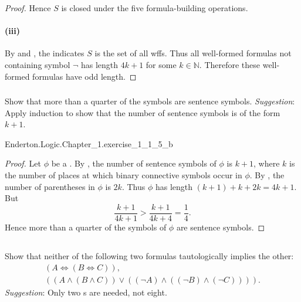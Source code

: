 \documentclass{report}
\begin{document}
\begin{proof}
      Hence $S$ is closed under the five formula-building operations.

    \paragraph{(iii)}%

      By  and ,
        the  indicates $S$ is the set of all
        wffs.
      Thus all well-formed formulas not containing symbol $\neg$ has length
        $4k + 1$ for some $k \in \mathbb{N}$.
      Therefore these well-formed formulas have odd length.

  \end{proof}

\subsubsection{}%

  Show that more than a quarter of the symbols are sentence symbols.
  \textit{Suggestion}: Apply induction to show that the number of sentence
    symbols is of the form $k + 1$.

    {Enderton.Logic.Chapter\_1.exercise\_1\_1\_5\_b}

  \begin{proof}

    Let $\phi$ be a .
    By , the number of sentence symbols of $\phi$ is
      $k + 1$, where $k$ is the number of places at which binary connective
      symbols occur in $\phi$.
    By , the number of parentheses in $\phi$ is
      $2k$.
    Thus $\phi$ has length $(k + 1) + k + 2k = 4k + 1$.
    But $$\frac{k + 1}{4k + 1} > \frac{k + 1}{4k + 4} = \frac{1}{4}.$$
    Hence more than a quarter of the symbols of $\phi$ are sentence symbols.

  \end{proof}

\subsection{}%

  Show that neither of the following two formulas tautologically implies the
    other:
    \begin{gather*}
      (A \Leftrightarrow (B \Leftrightarrow C)), \\
      ((A \land (B \land C)) \lor ((\neg A) \land ((\neg B) \land (\neg C)))).
    \end{gather*}
  \textit{Suggestion}: Only two s are needed, not
    eight.
\end{document}
